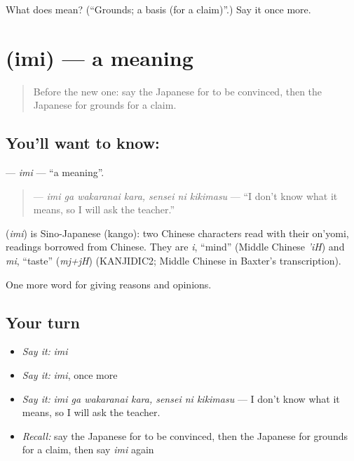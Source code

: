 \begin{tcolorbox}[breakable,colback=teal!4,colframe=teal!35!black,title={Before you move on}]
What does  mean? (\textquotedblleft{}Grounds; a basis (for a claim)\textquotedblright{}.) Say it once more.
\end{tcolorbox}
\section[\texorpdfstring{\ja{いみ} (imi)}{いみ (imi)}]{ (imi) — a meaning}

\label{lesson:JA-C318-imi}



\begin{quote}
Before the new one: say the Japanese for to be convinced, then the Japanese for grounds for a claim.
\end{quote}

\subsection*{You'll want to know: }
\textbf{} — \emph{imi} — \textquotedblleft{}a meaning\textquotedblright{}.

\begin{quote}
\textbf{  } — \emph{imi ga wakaranai kara, sensei ni kikimasu} — \textquotedblleft{}I don't know what it means, so I will ask the teacher.\textquotedblright{}
\end{quote}

\begin{cousinweb}
\textbf{} (\emph{imi}) is Sino-Japanese (kango): two Chinese characters read with their on'yomi, readings borrowed from Chinese. They are \emph{i}, \textquotedblleft{}mind\textquotedblright{} (Middle Chinese \emph{'iH}) and \emph{mi}, \textquotedblleft{}taste\textquotedblright{} (\emph{mj+jH}) (KANJIDIC2; Middle Chinese in Baxter's transcription).
\end{cousinweb}

\begin{grammarlens}[title={What you've built}]
One more word for giving reasons and opinions.
\end{grammarlens}

\subsection*{Your turn}
\begin{itemize}
\raggedright
  \item \emph{Say it:} \emph{imi}
  \item \emph{Say it:} \emph{imi}, once more
  \item \emph{Say it:} \emph{imi ga wakaranai kara, sensei ni kikimasu} — I don't know what it means, so I will ask the teacher.
  \item \emph{Recall:} say the Japanese for to be convinced, then the Japanese for grounds for a claim, then say \emph{imi} again
\end{itemize}

